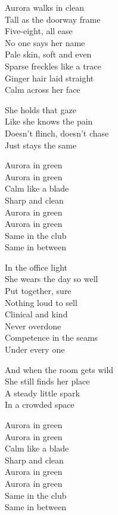 \begin{lyrics}
Aurora walks in clean\\
Tall as the doorway frame\\
Five-eight, all ease\\
No one says her name\\
Pale skin, soft and even\\
Sparse freckles like a trace\\
Ginger hair laid straight\\
Calm across her face

She holds that gaze\\
Like she knows the pain\\
Doesn't flinch, doesn't chase\\
Just stays the same

Aurora in green\\
Aurora in green\\
Calm like a blade\\
Sharp and clean\\
Aurora in green\\
Aurora in green\\
Same in the club\\
Same in between

In the office light\\
She wears the day so well\\
Put together, sure\\
Nothing loud to sell\\
Clinical and kind\\
Never overdone\\
Competence in the seams\\
Under every one

And when the room gets wild\\
She still finds her place\\
A steady little spark\\
In a crowded space

Aurora in green\\
Aurora in green\\
Calm like a blade\\
Sharp and clean\\
Aurora in green\\
Aurora in green\\
Same in the club\\
Same in between


\end{lyrics}

